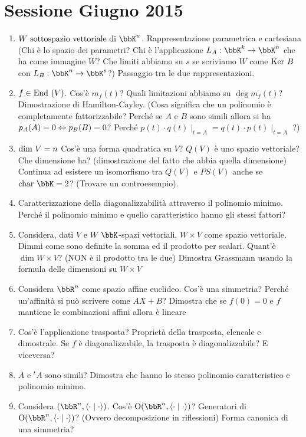 \documentclass[a4paper,NoNotes,GeneralMath]{stdmdoc}
\newcommand{\ssv}{\mbox{ sottospazio vettoriale di }}
\newcommand{\Char}{\mbox{char }}
\begin{document}
	\section*{Sessione Giugno 2015}
	\begin{enumerate}
		\item $W \ssv \bbK ^n$. Rappresentazione parametrica e cartesiana (Chi è lo spazio dei parametri? Chi è l'applicazione $L_A: \bbK^k \rar \bbK^n$ che ha come immagine $W$? Che limiti abbiamo su $s$ se scriviamo $W$ come $\mbox{Ker } B$ con $L_B: \bbK^n \rar \bbK^s$?) Passaggio tra le due rappresentazioni.
		\item $f \in \mbox{End }(V)$. Cos'è $m_f(t)$? Quali limitazioni abbiamo su $\deg m_f(t)$? Dimostrazione di Hamilton-Cayley. (Cosa significa che un polinomio è completamente fattorizzabile? Perché se $A$ e $B$ sono simili allora si ha $p_A(A) = 0 \Leftrightarrow p_B(B) = 0$? Perché $p(t)\cdot q(t)\mid_{t=A} = q(t)\cdot p(t)\mid_{t=A}$ ?)
		\item $\mbox{dim } V = n$ Cos'è una forma quadratica su $V$? $Q(V)$ è uno spazio vettoriale? Che dimensione ha? (dimostrazione del fatto che abbia quella dimensione) Continua ad esistere un isomorfismo tra $Q(V)$ e $PS(V)$ anche se $\Char \bbK = 2$? (Trovare un controesempio).
		\item Caratterizzazione della diagonalizzabilità attraverso il polinomio minimo. Perché il polinomio minimo e quello caratteristico hanno gli stessi fattori?
		\item Considera, dati $V$ e $W$ $\bbK$-spazi vettoriali, $W\times V$ come spazio vettoriale. Dimmi come sono definite la somma ed il prodotto per scalari. Quant'è $\dim W\times V$? (NON è il prodotto tra le due) Dimostra Grassmann usando la formula delle dimensioni su $W\times V$
		\item Considera $\bbR^n$ come spazio affine euclideo. Cos'è una simmetria? Perché un'affinità si può scrivere come $AX+B$? Dimostra che se $f(0)=0$ e $f$ mantiene le combinazioni affini allora è lineare
		\item Cos'è l'applicazione trasposta? Proprietà della trasposta, elencale e dimostrale. Se $f$ è diagonalizzabile, la trasposta è diagonalizzabile? E viceversa?
		\item $A$ e ${}^tA$ sono simili? Dimostra che hanno lo stesso polinomio caratteristico e polinomio minimo.
		\item Considera $(\bbR^n, \scal{\cdot}{\cdot})$. Cos'è $\mbox{O}(\bbR^n, \scal{\cdot}{\cdot})$? Generatori di $\mbox{O}(\bbR^n, \scal{\cdot}{\cdot})$? (Ovvero decomposizione in riflessioni) Forma canonica di una simmetria?

\end{enumerate}
\end{document}
